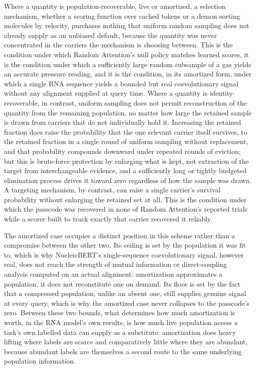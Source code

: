 \documentclass[11pt]{article}
\begin{document}
Where a quantity is population-recoverable, live or amortized, a selection mechanism, whether a scoring function over cached tokens or a demon sorting molecules by velocity, purchases nothing that uniform random sampling does not already supply as an unbiased default, because the quantity was never concentrated in the carriers the mechanism is choosing between. This is the condition under which Random Attention's null policy matches learned scores, it is the condition under which a sufficiently large random subsample of a gas yields an accurate pressure reading, and it is the condition, in its amortized form, under which a single RNA sequence yields a bounded but real coevolutionary signal without any alignment supplied at query time. Where a quantity is identity-recoverable, in contrast, uniform sampling does not permit reconstruction of the quantity from the remaining population, no matter how large the retained sample is drawn from carriers that do not individually hold it. Increasing the retained fraction does raise the probability that the one relevant carrier itself survives, to the retained fraction in a single round of uniform sampling without replacement, and that probability compounds downward under repeated rounds of eviction; but this is brute-force protection by enlarging what is kept, not extraction of the target from interchangeable evidence, and a sufficiently long or tightly budgeted elimination process drives it toward zero regardless of how the sample was drawn. A targeting mechanism, by contrast, can raise a single carrier's survival probability without enlarging the retained set at all. This is the condition under which the passcode was recovered in none of Random Attention's reported trials while a scorer built to track exactly that carrier recovered it reliably.

The amortized case occupies a distinct position in this scheme rather than a compromise between the other two. Its ceiling is set by the population it was fit to, which is why NucleicBERT's single-sequence coevolutionary signal, however real, does not reach the strength of mutual information or direct-coupling analysis computed on an actual alignment: amortization approximates a population, it does not reconstitute one on demand. Its floor is set by the fact that a compressed population, unlike an absent one, still supplies genuine signal at every query, which is why the amortized case never collapses to the passcode's zero. Between these two bounds, what determines how much amortization is worth, in the RNA model's own results, is how much live population access a task's own labelled data can supply as a substitute: amortization does heavy lifting where labels are scarce and comparatively little where they are abundant, because abundant labels are themselves a second route to the same underlying population information.
\end{document}
